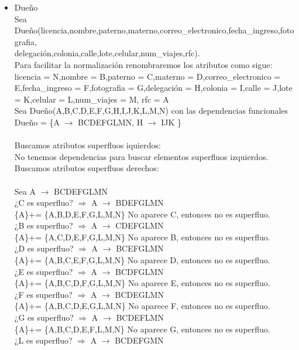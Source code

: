 \documentclass{article}
\begin{document}
\begin{itemize}
\item Dueño\\
Sea Dueño(licencia,nombre,paterno,materno,correo\_electronico,fecha\_ingreso,fotografia,\\ delegación,colonia,calle,lote,celular,num\_viajes,rfc).\\
Para facilitar la normalización renombraremos los atributos como sigue:
licencia = N,nombre = B,paterno = C,materno = D,correo\_electronico = E,fecha\_ingreso = F,fotografia = G,delegación = H,colonia = I,calle = J,lote = K,celular = L,num\_viajes = M, rfc = A\\
Sea Dueño(A,B,C,D,E,F,G,H,I,J,K,L,M,N) con las dependencias funcionales 
Dueño = \{A $\rightarrow$ BCDEFGLMN, H $\rightarrow$ IJK  \} \\
\\
Buscamos atributos superfluos iquierdos:\\
No tenemos dependencias para buscar elementos superfluos izquierdos.\\
Buscamos atributos superfluos derechos:\\
\\
Sea A $\rightarrow$ BCDEFGLMN\\
¿C es superfluo? $\Rightarrow$ A $\rightarrow$ BDEFGLMN \\
\{A\}+= \{A,B,D,E,F,G,L,M,N\} No aparece C, entonces no es superfluo.\\
¿B es superfluo? $\Rightarrow$ A $\rightarrow$ CDEFGLMN \\
\{A\}+= \{A,C,D,E,F,G,L,M,N\} No aparece B, entonces no es superfluo.\\
¿D es superfluo? $\Rightarrow$ A $\rightarrow$ BCEFGLMN \\
\{A\}+= \{A,B,C,E,F,G,L,M,N\}  No aparece D, entonces no es superfluo.\\
¿E es superfluo? $\Rightarrow$ A $\rightarrow$ BCDFGLMN \\
\{A\}+= \{A,B,C,D,F,G,L,M,N\}  No aparece E, entonces no es superfluo.\\
¿F es superfluo? $\Rightarrow$ A $\rightarrow$ BCDEGLMN \\
\{A\}+= \{A,B,C,D,E,G,L,M,N\}  No aparece F, entonces no es superfluo.\\
¿G es superfluo? $\Rightarrow$ A $\rightarrow$ BCDEFLMN \\
\{A\}+= \{A,B,C,D,E,F,L,M,N\}  No aparece G, entonces no es superfluo.\\
¿L es superfluo? $\Rightarrow$ A $\rightarrow$ BCDEFGMN \\

\end{itemize}
\end{document}
